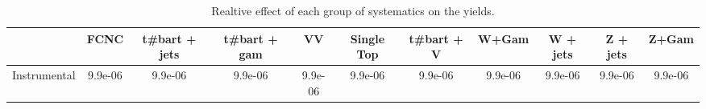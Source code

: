 \begin{table}[htbp]
\begin{center}
\begin{tabular}{|c|c|c|c|c|c|c|c|c|c|c|}
\hline 
      & FCNC      & t#bar{t} + jets      & t#bar{t} +  gam      & VV      & Single Top      & t#bar{t} + V      & W+Gam      & W + jets      & Z + jets      & Z+Gam \\ 
\hline 
 Instrumental & 9.9e-06 & 9.9e-06 & 9.9e-06 & 9.9e-06 & 9.9e-06 & 9.9e-06 & 9.9e-06 & 9.9e-06 & 9.9e-06 & 9.9e-06 \\ 
\hline 
\end{tabular} 
\caption{Realtive effect of each group of systematics on the yields.} 
\end{center} 
\end{table} 
